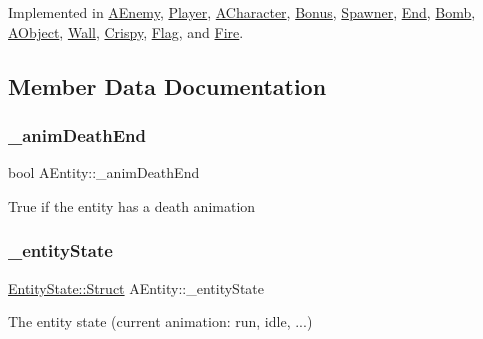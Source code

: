 Implemented in \hyperlink{class_a_enemy_a01e3b0313d6f29bf2cafe20f711c0550}{A\+Enemy}, \hyperlink{class_player_a1614c89caa50fa1527417ba6a2bbe6ee}{Player}, \hyperlink{class_a_character_af5a4d00f6104d45b821a2e88b80936b5}{A\+Character}, \hyperlink{class_bonus_a0dd8aa4474c3d1ef494ed8a916cc16cd}{Bonus}, \hyperlink{class_spawner_a9325e76299405d5d74abfb72f4ea2380}{Spawner}, \hyperlink{class_end_a7154532cce1c86f4f5bfa98eb0c25574}{End}, \hyperlink{class_bomb_a9808d8efcc57b9ce7b0bd48d95875aad}{Bomb}, \hyperlink{class_a_object_af35bb4b68af0a11bb1fcf617bde41ecd}{A\+Object}, \hyperlink{class_wall_a29d3c4daa11dbb20d758b1fc285ed7a4}{Wall}, \hyperlink{class_crispy_ab33c8c68fa636df5721581e8f68ceae3}{Crispy}, \hyperlink{class_flag_adeaab6cd88bbc3284f8b4f1b2f78242b}{Flag}, and \hyperlink{class_fire_a86114cf78108a4b202b75e1f383b3e00}{Fire}.



\subsection{Member Data Documentation}
\mbox{\label{class_a_entity_a465977aaabcdb73a1b48742897348127}} 
\subsubsection{\texorpdfstring{\+\_\+anim\+Death\+End}{\_animDeathEnd}}
{\footnotesize\ttfamily bool A\+Entity\+::\+\_\+anim\+Death\+End\hspace{0.3cm}{\ttfamily [protected]}}

True if the entity has a death animation \mbox{\label{class_a_entity_a261052ce4fac95fdba699e7ca48d2dd3}} 
\subsubsection{\texorpdfstring{\+\_\+entity\+State}{\_entityState}}
{\footnotesize\ttfamily \hyperlink{struct_entity_state_1_1_struct}{Entity\+State\+::\+Struct} A\+Entity\+::\+\_\+entity\+State\hspace{0.3cm}{\ttfamily [protected]}}

The entity state (current animation\+: run, idle, ...) \mbox{\label{class_a_entity_abd634d5c2a0be6a6627cade7e4e109d0}} 
